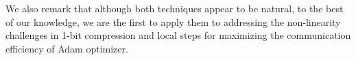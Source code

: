 We also remark that although both techniques appear to be natural, to the best of our knowledge,  we are the first to apply them to addressing the non-linearity challenges in 1-bit compression and local steps for maximizing the communication efficiency of Adam optimizer.  


